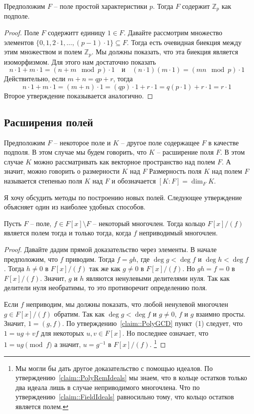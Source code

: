 \begin{claim}
\label{claim::PrimeSubfieldCharP}
Предположим $F$ -- поле простой характеристики $p$.
Тогда $F$ содержит $\mathbb Z_p$ как подполе.
\end{claim}
\begin{proof}
Поле $F$ содержитт единицу $1\in F$.
Давайте рассмотрим множество элементов $\{0, 1, 2\cdot 1, \ldots , (p-1)\cdot 1\}\subseteq F$.
Тогда есть очевидная биекция между этим множеством и полем $\mathbb Z_p$.
Мы должны показать, что эта биекция является изоморфизмом.
Для этого нам достаточно показать
\[
n\cdot 1 + m \cdot 1 = (n+m\!\!\mod p)\cdot 1\quad\text{и}\quad
(n\cdot 1)(m\cdot 1) = (mn\!\!\mod p)\cdot 1
\]
Действительно, если $m+n = qp + r$, тогда
\[
n\cdot 1 + m \cdot 1 = (m+n)\cdot 1 = (qp) \cdot 1 + r\cdot 1 = q(p \cdot 1) + r\cdot 1 = r\cdot 1
\]
Второе утверждение показывается аналогично.
\end{proof}

\subsection{Расширения полей}

Предположим $F$ -- некоторое поле и $K$ -- другое поле содержащее $F$ в качестве подполя.
В этом случае мы будем говорить, что $K$ -- расширение поля $F$.
В этом случае $K$ можно рассматривать как векторное пространство над полем $F$.
А значит, можно говорить о размерности $K$ над $F$
Размерность поля $K$ над полем $F$ называется степенью поля $K$ над $F$ и обозначается $[K:F] = \dim_F K$.

Я хочу обсудить методы по построению новых полей.
Следующее утверждение объясняет один из наиболее удобных способов.

\begin{claim}
\label{claim::PolyQuotField}
Пусть $F$ -- поле, $f\in F[x]\setminus F$ -- некоторый многочлен.
Тогда кольцо $F[x]/(f)$ является полем тогда и только тогда, когда $f$ неприводимый многочлен.
\end{claim}
\begin{proof}
Давайте дадим прямой доказательство через элементы.
В начале предположим, что $f$ приводим.
Тогда $f = gh$, где $\deg g < \deg f$ и $\deg h < \deg f$.
Тогда $h\neq 0$ в $F[x]/(f)$ так же как $g\neq 0$ в $F[x]/(f)$.
Но $gh = f = 0$ в $F[x]/(f)$.
Значит, $g$ и $h$ являются ненулевыми делителями нуля.
Так как делители нуля необратимы, то это противоречит определению поля.

Если $f$ неприводим, мы должны показать, что любой ненулевой многочлен $g\in F[x]/(f)$ обратим.
Так как $\deg g < \deg f$ и $g\neq 0$, $f$ и $g$ взаимно просты.
Значит, $1 = (g, f)$.
По утверждению~\ref{claim::PolyGCD} пункт~(1) следует, что $1 = ug + vf$ для некоторых $u,v\in F[x]$.
Но последнее означает, что $1 = ug\pmod f$ а значит, $u = g^{-1}$ в $F[x]/(f)$.%
\footnote{Мы могли бы дать другое доказательство с помощью идеалов.
По утверждению~\ref{claim::PolyRemIdeals} мы знаем, что в кольце остатков только два идеала лишь в случае неприводимого многочлена.
Что по утверждению~\ref{claim::FieldIdeals} равносильно тому, что кольцо остатков является полем.}
\end{proof}

